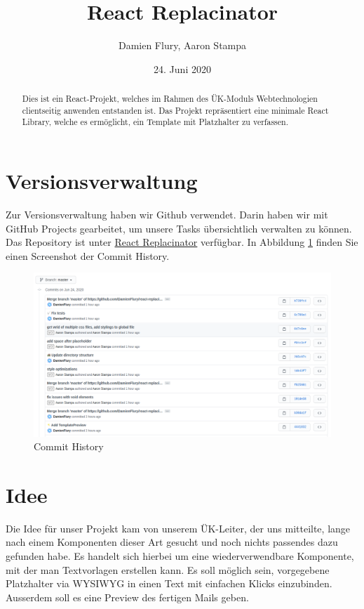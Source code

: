 \documentclass[a4paper, titlepage]{article}
\title{React Replacinator}
\author{Damien Flury, Aaron Stampa}
\date{24. Juni 2020}
\begin{document}
  \maketitle
  \begin{abstract}
  Dies ist ein React-Projekt, welches im
  Rahmen des ÜK-Moduls \glqq{}Webtechnologien clientseitig anwenden\grqq{}
  entstanden ist. Das Projekt repräsentiert eine
  minimale React Library, welche es ermöglicht,
  ein Template mit Platzhalter zu verfassen.
  \end{abstract}
  \tableofcontents
  \newpage
  \section{Versionsverwaltung}
  Zur Versionsverwaltung haben wir Github verwendet.
  Darin haben wir mit GitHub Projects gearbeitet,
  um unsere Tasks übersichtlich verwalten zu
  können. Das Repository ist unter 
  \href{https://github.com/DamienFlury/react-replacinator}{React Replacinator}
  verfügbar. In Abbildung \ref{git:commit-history} finden Sie einen Screenshot
  der Commit History.

  \begin{figure}
    \includegraphics[width=\textwidth]{images/commit-history.png}
    \caption{Commit History}
    \label{git:commit-history}
  \end{figure}
  \section{Idee}
  Die Idee für unser Projekt kam von unserem ÜK-Leiter, der uns mitteilte, 
  lange nach einem Komponenten dieser Art gesucht und noch nichts passendes 
  dazu gefunden habe. 
  Es handelt sich hierbei um eine wiederverwendbare Komponente, mit der man 
  Textvorlagen erstellen kann. Es soll möglich sein, vorgegebene Platzhalter 
  via WYSIWYG in einen Text mit einfachen Klicks einzubinden. 
  Ausserdem soll es eine Preview des fertigen Mails geben.
\end{document}

